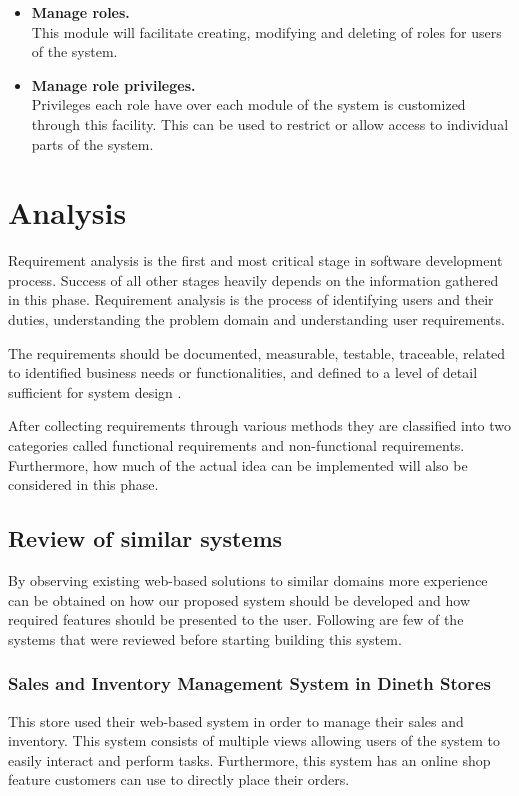 \documentclass[12pt]{report}
\begin{document}
\begin{itemize}
	\item {\bf{Manage roles.}}\\
	      This module will facilitate creating, modifying and deleting of roles for users of the system.

	\item {\bf{Manage role privileges.}}\\
	      Privileges each role have over each module of the system is customized through this facility. This can be used to restrict or allow access to individual parts of the system.
\end{itemize}

\newpage
\chapter{Analysis}

Requirement analysis is the first and most critical stage in software development process. Success of all other stages heavily depends on the information gathered in this phase. Requirement analysis is the process of identifying users and their duties, understanding the problem domain and understanding user requirements.

The requirements should be documented, measurable, testable, traceable, related to identified business needs or functionalities, and defined to a level of detail sufficient for system design \cite{sommerville_2008_software}.

After collecting requirements through various methods they are classified into two categories called functional requirements and non-functional requirements. Furthermore, how much of the actual idea can be implemented will also be considered in this phase.

\section{Review of similar systems}
By observing existing web-based solutions to similar domains  more experience can be obtained on how our proposed system should be developed and how required features should be presented to the user.  Following are few of the systems that were reviewed before starting building this system.

\subsection{Sales and Inventory Management System in Dineth Stores}
This store used their web-based system in order to manage their sales and inventory. This system consists of multiple views allowing users of the system to easily interact and perform tasks.  Furthermore, this system has an online shop feature customers can use to directly place their orders.
\end{document}

